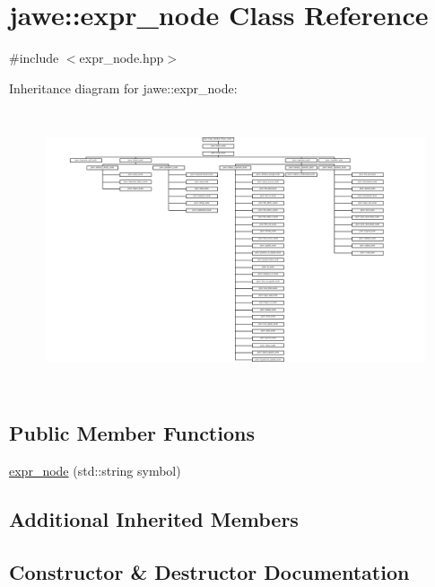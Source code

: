\hypertarget{classjawe_1_1expr__node}{}\section{jawe\+:\+:expr\+\_\+node Class Reference}
\label{classjawe_1_1expr__node}


{\ttfamily \#include $<$expr\+\_\+node.\+hpp$>$}

Inheritance diagram for jawe\+:\+:expr\+\_\+node\+:\begin{figure}[H]
\begin{center}
\leavevmode
\includegraphics[height=8.258064cm]{classjawe_1_1expr__node}
\end{center}
\end{figure}
\subsection*{Public Member Functions}
\begin{DoxyCompactItemize}
\item 
\hyperlink{classjawe_1_1expr__node_a3b525868667d0354a7de8f79ad4e1111}{expr\+\_\+node} (std\+::string symbol)
\end{DoxyCompactItemize}
\subsection*{Additional Inherited Members}


\subsection{Constructor \& Destructor Documentation}
\mbox{\label{classjawe_1_1expr__node_a3b525868667d0354a7de8f79ad4e1111}} 
